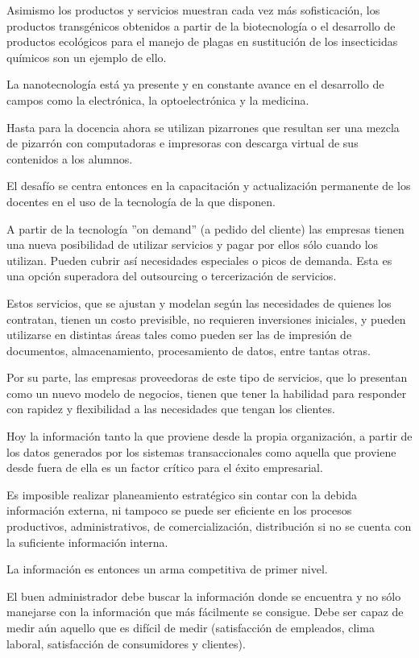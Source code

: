\documentclass[a4paper, 12pt]{article}
\begin{document}
Asimismo los productos y servicios muestran cada vez más sofisticación, los productos transgénicos obtenidos a partir de la biotecnología o el desarrollo de productos ecológicos para el manejo de plagas en sustitución de los insecticidas químicos son un ejemplo de ello.

La nanotecnología está ya presente y en constante avance en el desarrollo de campos como la electrónica, la optoelectrónica y la medicina.

Hasta para la docencia ahora se utilizan pizarrones que resultan ser una mezcla de pizarrón con computadoras e impresoras con descarga virtual de sus contenidos a los alumnos. 

El desafío se centra entonces en la capacitación y actualización permanente de los docentes en el uso de la tecnología de la que disponen.

A partir de la tecnología  ''on demand''  (a pedido del cliente) las empresas tienen una nueva posibilidad de utilizar servicios y pagar por ellos sólo cuando los utilizan. Pueden cubrir así necesidades especiales o picos de demanda. Esta es una opción superadora del outsourcing o tercerización de servicios.

Estos servicios, que se ajustan y modelan según las necesidades de quienes los contratan, tienen un costo previsible, no requieren inversiones iniciales, y pueden utilizarse en distintas áreas tales como pueden ser las de impresión de documentos, almacenamiento, procesamiento de datos, entre tantas otras.

Por su parte, las empresas proveedoras de este tipo de servicios, que lo presentan como un nuevo modelo de negocios, tienen que tener la habilidad para responder con rapidez y flexibilidad a las necesidades que tengan los clientes.

Hoy la información tanto la que proviene desde la propia organización, a partir de los datos generados por los sistemas transaccionales como aquella que proviene desde fuera de ella es un factor crítico para el éxito empresarial.

Es imposible realizar planeamiento estratégico sin contar con la debida información externa, ni tampoco se puede ser eficiente en los procesos productivos, administrativos, de comercialización, distribución si no se cuenta con la suficiente información interna.

La información es entonces un arma competitiva de primer nivel.

El buen administrador debe buscar la información donde se encuentra y no sólo manejarse con la información que más fácilmente se consigue. Debe ser capaz de medir aún aquello que es difícil de medir (satisfacción de empleados, clima laboral, satisfacción de consumidores y clientes).
\end{document}
